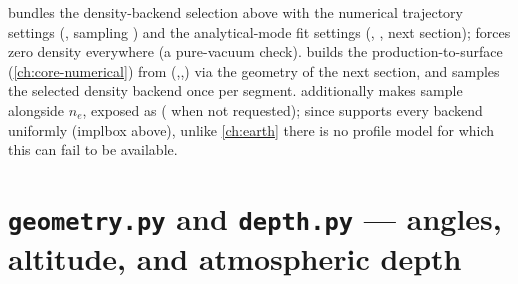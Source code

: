 \begin{implbox}
 bundles the density-backend selection above
with the numerical trajectory settings (, sampling
) and the analytical-mode fit settings
(, , next section);
 forces zero density everywhere (a pure-vacuum check).
 builds the production-to-surface
 (\cref{ch:core-numerical}) from
(,,) via the geometry of the
next section, and samples the selected density backend once per segment.
 additionally makes
 sample 
alongside $n_e$, exposed as  ( when not
requested); since  supports every backend
uniformly (implbox above), unlike \cref{ch:earth} there is no profile model
for which this can fail to be available.
\end{implbox}

\section{\texttt{geometry.py} and \texttt{depth.py} --- angles, altitude, and atmospheric depth}
\label{sec:atmosphere-geometry}


